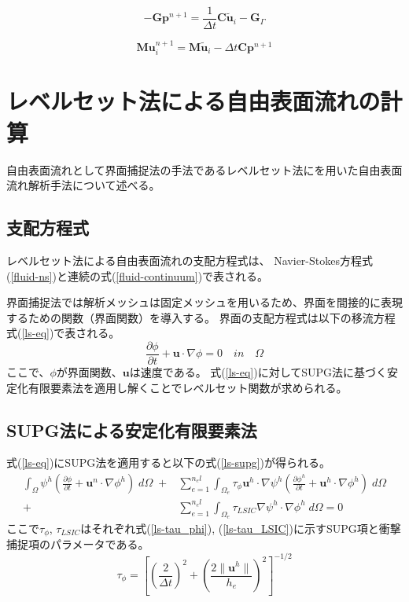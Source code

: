 \documentclass[8pt,a4paper]{article}
\newcommand{\bm}{\boldsymbol}
\begin{document}
\begin{equation}
\label{matrix-poisson}
	-\bm{G} \bm{p}^{n+1} = \frac{1}{\Delta t} \bm{C} \tilde{\bm{u}}_{i} - \bm{G}_{\Gamma}
\end{equation}

\begin{equation}
\label{matrix-correct}
	\bm{M} \bm{u}_{i}^{n+1} = \bm{M} \tilde{\bm{u}}_{i} - \Delta t \bm{C} \bm{p}^{n+1}
\end{equation}

\newpage
\section{レベルセット法による自由表面流れの計算}
自由表面流れとして界面捕捉法の手法であるレベルセット法にを用いた自由表面流れ解析手法について述べる。

\subsection{支配方程式}
レベルセット法による自由表面流れの支配方程式は、
Navier-Stokes方程式(\ref{fluid-ns})と連続の式(\ref{fluid-continuum})で表される。

界面捕捉法では解析メッシュは固定メッシュを用いるため、界面を間接的に表現するための関数（界面関数）を導入する。
界面の支配方程式は以下の移流方程式(\ref{ls-eq})で表される。
\begin{equation}
\label{ls-eq}
	\frac{\partial \phi}{\partial t} + \bm{u} \cdot \nabla \phi = 0 \quad in \quad \Omega
\end{equation}
ここで、$\phi$が界面関数、$\bm{u}$は速度である。
式(\ref{ls-eq})に対してSUPG法に基づく安定化有限要素法を適用し解くことでレベルセット関数が求められる。

\subsection{SUPG法による安定化有限要素法}
式(\ref{ls-eq})にSUPG法を適用すると以下の式(\ref{ls-supg})が得られる。
\begin{equation}
\label{ls-supg}
		\begin{split}
		\int_{\Omega} \psi^{h}\left( \frac{\partial \phi}{\partial t} + \bm{u}^{n} \cdot \nabla \phi^{h} \right) \; d\Omega \;+& 
		\sum^{n_el}_{e=1} \int_{\Omega_{e}} \tau_{\phi} \bm{u}^{h} \cdot \nabla \psi^{h} \left( \frac{\partial \phi^{h}}{\partial t} + \bm{u}^{h} \cdot \nabla \phi^{h} \right) \; d\Omega \\
		+& \sum^{n_el}_{e=1} \int_{\Omega_{e}} \tau_{LSIC} \nabla \psi^{h} \cdot \nabla \phi^{h} \; d\Omega = 0
	\end{split}
\end{equation}
ここで$\tau_\phi$, $\tau_{LSIC}$はそれぞれ式(\ref{ls-tau_phi}), (\ref{ls-tau_LSIC})に示すSUPG項と衝撃捕捉項のパラメータである。
\begin{equation}
\label{ls-tau_phi}
	\tau_{\phi} = \left[ \left(\frac{2}{\Delta t} \right)^2 + \left(\frac{2 \| \bm{u}^{h} \|}{h_{e}} \right)^2 \right]^{-1/2}
\end{equation}
\end{document}

